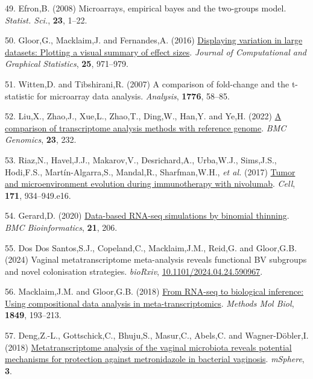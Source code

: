 \documentclass[
]{article}
\newlength{\cslhangindent}
\newenvironment{CSLReferences}[2] %
 {\begin{list}{}{%
  \setlength{\itemindent}{0pt}
  \setlength{\leftmargin}{0pt}
  \setlength{\parsep}{0pt}
  \ifodd #1
   \setlength{\leftmargin}{\cslhangindent}
   \setlength{\itemindent}{-1\cslhangindent}
  \fi
  \setlength{\itemsep}{#2\baselineskip}}}
 {\end{list}}
\begin{document}
\begin{CSLReferences}{1}{1}
49. Efron,B. (2008) Microarrays, empirical bayes and the two-groups
model. \emph{Statist. Sci.}, \textbf{23}, 1--22.

50. Gloor,G., Macklaim,J. and Fernandes,A. (2016)
\href{https://doi.org/10.1080/10618600.2015.1131161}{Displaying
variation in large datasets: Plotting a visual summary of effect sizes}.
\emph{Journal of Computational and Graphical Statistics}, \textbf{25},
971--979.

51. Witten,D. and Tibshirani,R. (2007) A comparison of fold-change and
the t-statistic for microarray data analysis. \emph{Analysis},
\textbf{1776}, 58--85.

52. Liu,X., Zhao,J., Xue,L., Zhao,T., Ding,W., Han,Y. and Ye,H. (2022)
\href{https://doi.org/10.1186/s12864-022-08465-0}{A comparison of
transcriptome analysis methods with reference genome}. \emph{BMC
Genomics}, \textbf{23}, 232.

53. Riaz,N., Havel,J.J., Makarov,V., Desrichard,A., Urba,W.J.,
Sims,J.S., Hodi,F.S., Martín-Algarra,S., Mandal,R., Sharfman,W.H.,
\emph{et al.} (2017)
\href{https://doi.org/10.1016/j.cell.2017.09.028}{Tumor and
microenvironment evolution during immunotherapy with nivolumab}.
\emph{Cell}, \textbf{171}, 934--949.e16.

54. Gerard,D. (2020)
\href{https://doi.org/10.1186/s12859-020-3450-9}{Data-based RNA-seq
simulations by binomial thinning}. \emph{BMC Bioinformatics},
\textbf{21}, 206.

55. Dos Dos Santos,S.J., Copeland,C., Macklaim,J.M., Reid,G. and
Gloor,G.B. (2024) Vaginal metatranscriptome meta-analysis reveals
functional BV subgroups and novel colonisation strategies.
\emph{bioRxiv},
\href{https://doi.org/10.1101/2024.04.24.590967}{10.1101/2024.04.24.590967}.

56. Macklaim,J.M. and Gloor,G.B. (2018)
\href{https://doi.org/10.1007/978-1-4939-8728-3/_13}{From {RNA}-seq to
biological inference: Using compositional data analysis in
meta-transcriptomics}. \emph{Methods Mol Biol}, \textbf{1849}, 193--213.

57. Deng,Z.-L., Gottschick,C., Bhuju,S., Masur,C., Abels,C. and
Wagner-Döbler,I. (2018)
\href{https://doi.org/10.1128/mSphereDirect.00262-18}{Metatranscriptome
analysis of the vaginal microbiota reveals potential mechanisms for
protection against metronidazole in bacterial vaginosis}.
\emph{mSphere}, \textbf{3}.


\end{CSLReferences}
\end{document}
